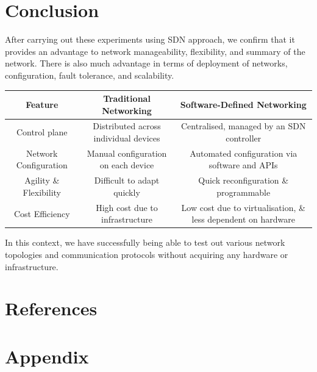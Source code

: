 \documentclass{article}
\begin{document}
\section{Conclusion}
After carrying out these experiments using SDN approach, we confirm that it provides an advantage to network manageability, flexibility, and summary of the network. There is also much advantage in terms of deployment of networks, configuration, fault tolerance, and scalability. 
	\begin{table}[h]
		\small
		\begin{tabular}{|c|c|c|}
			\hline
			Feature & Traditional Networking & Software-Defined Networking \\
			\hline
			Control plane & Distributed across individual devices & Centralised, managed by an SDN controller \\
			Network Configuration & Manual configuration on each device & Automated configuration via software and APIs \\
			Agility \& Flexibility & Difficult to adapt quickly & Quick reconfiguration \& programmable \\
			Cost Efficiency & High cost due to infrastructure & Low cost due to virtualisation, \& less dependent on hardware \\
			\hline
		\end{tabular}
	\end{table}
\par In this context, we have successfully being able to test out various network topologies and communication protocols without acquiring any hardware or infrastructure.  
\newpage
\section{References}



\newpage
\section{Appendix}
\renewcommand{\thesection}{\alph{section}}
\setcounter{section}{0}
\end{document}
